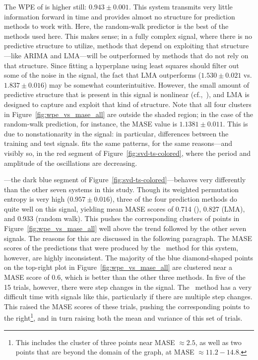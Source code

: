The WPE of \gcc is higher still: $0.943 \pm 0.001$.  This system
transmits very little information forward in time and provides almost
no structure for prediction methods to work with.  Here, the
random-walk predictor is the best of the methods used here.  This
makes sense; in a fully complex signal, where there is no predictive
structure to utilize, methods that depend on exploiting that
structure---like ARIMA and LMA---will be outperformed by methods that
do not rely on that structure.
%
%
Since fitting a hyperplane using least squares should filter out some
of the noise in the signal, the fact that LMA outperforms \arima
($1.530 \pm 0.021$ vs. $1.837 \pm 0.016$) may be somewhat
counterintuitive.  However, the small amount of predictive structure
that is present in this signal is nonlinear (cf.,~\cite{mytkowicz09}),
and LMA is designed to capture and exploit that kind of structure.
Note that all four \gcc clusters in Figure~\ref{fig:wpe_vs_mase_all}
are outside the shaded region; in the case of the random-walk
prediction, for instance, the MASE value is $1.1381 \pm 0.011$.  This
is due to nonstationarity in the signal: in particular, differences
between the training and test signals.  \svdtwo fits the same
patterns, for the same reasons---and visibly so, in the red segment of
Figure~\ref{fig:svd-ts-colored}, where the period and amplitude of the
oscillations are decreasing.

\svdone---the dark blue segment of
Figure~\ref{fig:svd-ts-colored}---behaves very differently than the
other seven systems in this study.  Though its weighted permutation
entropy is very high ($0.957 \pm 0.016$), three of the four prediction
methods do quite well on this signal, yielding mean MASE scores of
0.714 (\arima), 0.827 (LMA), and 0.933 (random walk).  This pushes the
corresponding clusters of points in Figure~\ref{fig:wpe_vs_mase_all}
well above the trend followed by the other seven signals.  The reasons
for this are discussed in the following paragraph.  The MASE scores of
the predictions that were produced by the \naive ~method for this
system, however, are highly inconsistent.  The majority of the blue
diamond-shaped points on the top-right plot in
Figure~\ref{fig:wpe_vs_mase_all} are clustered near a MASE score of
0.6, which is better than the other three methods.  In five of the 15
\svdone trials, however, there were step changes in the signal.  The
\naive ~method has a very difficult time with signals like this,
particularly if there are multiple step changes.  This raised the MASE
scores of these trials, pushing the corresponding points to the
right\footnote{This includes the cluster of three points near MASE
  $\approx 2.5$, as well as two points that are beyond the domain of
  the graph, at MASE $\approx 11.2-14.8$.}, and in turn raising both
the mean and variance of this set of trials.

